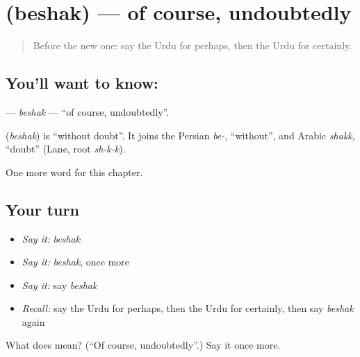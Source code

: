 \section[\texorpdfstring{\ur{بے} \ur{شک} (beshak)}{بے شک (beshak)}]{  (beshak) — of course, undoubtedly}

\label{lesson:UR-C192-beshak}



\begin{quote}
Before the new one: say the Urdu for perhaps, then the Urdu for certainly.
\end{quote}

\subsection*{You'll want to know:  }
\textbf{ } — \emph{beshak} — \textquotedblleft{}of course, undoubtedly\textquotedblright{}.

\begin{cousinweb}
\textbf{ } (\emph{beshak}) is \textquotedblleft{}without doubt\textquotedblright{}. It joins the Persian \emph{be-}, \textquotedblleft{}without\textquotedblright{}, and Arabic \emph{shakk}, \textquotedblleft{}doubt\textquotedblright{} (Lane, root \emph{sh-k-k}).
\end{cousinweb}

\begin{grammarlens}[title={What you've built}]
One more word for this chapter.
\end{grammarlens}

\subsection*{Your turn}
\begin{itemize}
\raggedright
  \item \emph{Say it:} \emph{beshak}
  \item \emph{Say it:} \emph{beshak}, once more
  \item \emph{Say it:} say \emph{beshak}
  \item \emph{Recall:} say the Urdu for perhaps, then the Urdu for certainly, then say \emph{beshak} again
\end{itemize}

\begin{tcolorbox}[breakable,colback=teal!4,colframe=teal!35!black,title={Before you move on}]
What does   mean? (\textquotedblleft{}Of course, undoubtedly\textquotedblright{}.) Say it once more.
\end{tcolorbox}
